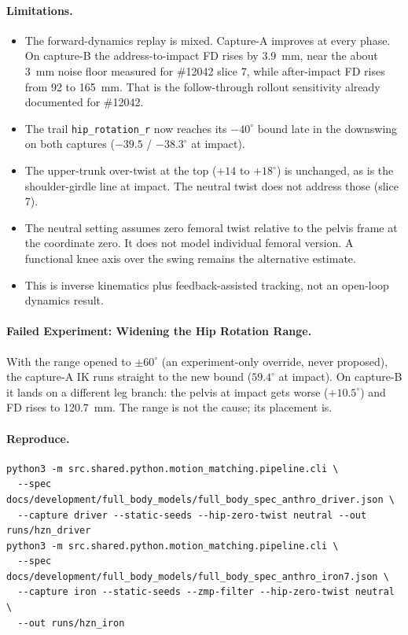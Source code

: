 \documentclass[11pt]{article}
\begin{document}
\paragraph{Limitations.}
\begin{itemize}
  \item The forward-dynamics replay is mixed. Capture-A improves at every
    phase. On capture-B the address-to-impact FD rises by 3.9~mm, near the
    about 3~mm noise floor measured for \#12042 slice 7, while after-impact FD
    rises from 92 to 165~mm. That is the follow-through rollout sensitivity
    already documented for \#12042.
  \item The trail \texttt{hip\_rotation\_r} now reaches its $-40^\circ$ bound
    late in the downswing on both captures ($-39.5$ / $-38.3^\circ$ at
    impact).
  \item The upper-trunk over-twist at the top ($+14$ to $+18^\circ$) is
    unchanged, as is the shoulder-girdle line at impact. The neutral twist
    does not address those (slice 7).
  \item The neutral setting assumes zero femoral twist relative to the pelvis
    frame at the coordinate zero. It does not model individual femoral version.
    A functional knee axis over the swing remains the alternative estimate.
  \item This is inverse kinematics plus feedback-assisted tracking, not an
    open-loop dynamics result.
\end{itemize}

\paragraph{Failed Experiment: Widening the Hip Rotation Range.} With the
range opened to $\pm60^\circ$ (an experiment-only override, never proposed),
the capture-A IK runs straight to the new bound ($59.4^\circ$ at impact). On
capture-B it lands on a different leg branch: the pelvis at impact gets worse
($+10.5^\circ$) and FD rises to 120.7~mm. The range is not the cause; its
placement is.

\paragraph{Reproduce.}
\begin{verbatim}
python3 -m src.shared.python.motion_matching.pipeline.cli \
  --spec docs/development/full_body_models/full_body_spec_anthro_driver.json \
  --capture driver --static-seeds --hip-zero-twist neutral --out runs/hzn_driver
python3 -m src.shared.python.motion_matching.pipeline.cli \
  --spec docs/development/full_body_models/full_body_spec_anthro_iron7.json \
  --capture iron --static-seeds --zmp-filter --hip-zero-twist neutral \
  --out runs/hzn_iron
\end{verbatim}
\end{document}

